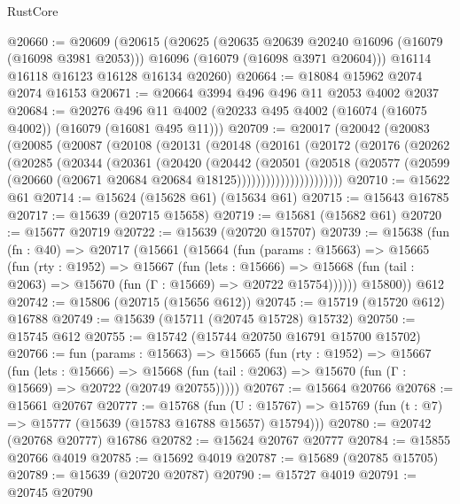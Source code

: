 \begin{lexlean}{RustCore}
\begin{coremodule}
@20660 := @20609
    (@20615
      (@20625
        (@20635 @20639 @20240 @16096 (@16079 (@16098 @3981 @2053)))
        @16096
        (@16079 (@16098 @3971 @20604)))
      @16114
      @16118
      @16123
      @16128
      @16134
      @20260)
@20664 := @18084 @15962 @2074 @2074 @16153
@20671 := @20664 @3994 @496 @496 @11 @2053 @4002 @2037
@20684 := @20276
    @496
    @11
    @4002
    (@20233 @495 @4002 (@16074 (@16075 @4002)) (@16079 (@16081 @495 @11)))
@20709 := @20017
    (@20042
      (@20083
        (@20085
          (@20087
            (@20108
              (@20131
                (@20148
                  (@20161
                    (@20172
                      (@20176
                        (@20262
                          (@20285
                            (@20344
                              (@20361
                                (@20420
                                  (@20442
                                    (@20501
                                      (@20518
                                        (@20577
                                          (@20599
                                            (@20660
                                              (@20671 @20684 @20684 @18125))))))))))))))))))))))
@20710 := @15622 @61
@20714 := @15624 (@15628 @61) (@15634 @61)
@20715 := @15643 @16785
@20717 := @15639 (@20715 @15658)
@20719 := @15681 (@15682 @61)
@20720 := @15677 @20719
@20722 := @15639 (@20720 @15707)
@20739 := @15638
    (fun (fn : @40) =>
    @20717
      (@15661
        (@15664
          (fun (params : @15663) =>
          @15665
            (fun (rty : @1952) =>
            @15667
              (fun (lets : @15666) =>
              @15668 (fun (tail : @2063) => @15670 (fun (Γ : @15669) => @20722 @15754))))))
        @15800))
    @612
@20742 := @15806 (@20715 (@15656 @612))
@20745 := @15719 (@15720 @612) @16788
@20749 := @15639 (@15711 (@20745 @15728) @15732)
@20750 := @15745 @612
@20755 := @15742 (@15744 @20750 @16791 @15700 @15702)
@20766 := fun (params : @15663) =>
  @15665
    (fun (rty : @1952) =>
    @15667
      (fun (lets : @15666) =>
      @15668 (fun (tail : @2063) => @15670 (fun (Γ : @15669) => @20722 (@20749 @20755)))))
@20767 := @15664 @20766
@20768 := @15661 @20767
@20777 := @15768
    (fun (U : @15767) => @15769 (fun (t : @7) => @15777 (@15639 (@15783 @16788 @15657) @15794)))
@20780 := @20742 (@20768 @20777) @16786
@20782 := @15624 @20767 @20777
@20784 := @15855 @20766 @4019
@20785 := @15692 @4019
@20787 := @15689 (@20785 @15705)
@20789 := @15639 (@20720 @20787)
@20790 := @15727 @4019
@20791 := @20745 @20790

\end{coremodule}
\end{lexlean}
